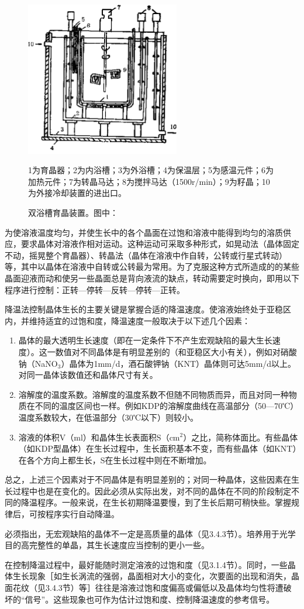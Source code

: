 \begin{figure}[H]
 \centering
 \includegraphics[width=0.6\textwidth]{fig/cp03/img3.20.jpg}
 \caption{双浴槽育晶装置。图中：}
 1为育晶器；2为内浴槽；3为外浴槽；4为保温层；5为感温元件；6为加热元件；7为转晶马达；8为搅拌马达（1500r/min）；9为籽晶；10为外接冷却装置的进出口。
\end{figure}

为使溶液温度均匀，并使生长中的各个晶面在过饱和溶液中能得到均匀的溶质供应，要求晶体对溶液作相对运动。这种运动可采取多种形式，如晃动法（晶体固定不动，摇晃整个育晶器）、转晶法（晶体在溶液中作自转，公转或行星式转动）等，其中以晶体在溶液中自转或公转最为常用。为了克服这种方式所造成的的某些晶面迎液而动和使另一些晶面总是背向液流的缺点，转动需要定时换向，即用以下程序进行控制：正转---停转---反转---停转---正转。

降温法控制晶体生长的主要关键是掌握合适的降温速度。使溶液始终处于亚稳区内，并维持适宜的过饱和度，降温速度一般取决于以下述几个因素：
\begin{enumerate}[(1)]
\item 晶体的最大透明生长速度（即在一定条件下不产生宏观缺陷的最大生长速度）。这一数值对不同晶体是有明显差别的（和亚稳区大小有关），例如对硝酸钠（NaNO$_3$）晶体为1mm/d，酒石酸钾钠（KNT）晶体则可达5mm/d以上。对同一晶体该数值还和晶体尺寸有关。
\item 溶解度的温度系数。溶解度的温度系数不但随不同物质而异，而且对同一种物质在不同的温度区间也一样。例如KDP的溶解度曲线在高温部分（50---70℃）温度系数较大，在低温部分（30℃以下）则较小。
\item 溶液的体积V（ml）和晶体生长表面积S（cm$^2$）之比，简称体面比。有些晶体（如KDP型晶体）在生长过程中，生长面积基本不变，而有些晶体（如KNT）在各个方向上都生长，S在生长过程中则在不断增加。
\end{enumerate}

总之，上述三个因素对于不同晶体是有明显差别的；对同一种晶体，这些因素在生长过程中也是在变化的。因此必须从实际出发，对不同的晶体在不同的阶段制定不同的降温程序。一般来说，在生长初期降温要慢，到了生长后期可稍快些。掌握规律后，可按程序实行自动降温。

必须指出，无宏观缺陷的晶体不一定是高质量的晶体（见3.4.3节）。培养用于光学目的高完整性的单晶，其生长速度应当控制的更小一些。

在控制降温过程中，最好能随时测定溶液的过饱和度（见3.1.4节）。同时，一些晶体生长现象［如生长涡流的强弱，晶面相对大小的变化，次要面的出现和消失，晶面花纹（见3.4.3节）等］往往是溶液过饱和度偏高或偏低以及晶体均匀性将遭破坏的“信号”。这些现象也可作为估计过饱和度、控制降温速度的参考信号。